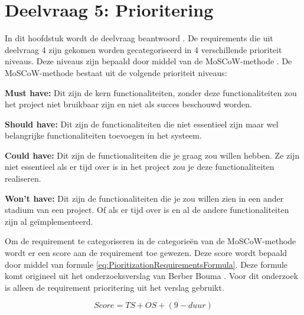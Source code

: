 \section{Deelvraag 5: Prioritering}
\label{sec:Prioritering}
In dit hoofdstuk wordt de deelvraag beantwoord \qw{\textit{\SubquestionFive}}.
De requirements die uit deelvraag 4 zijn gekomen worden gecategoriseerd in 4 verschillende prioriteit niveaus.
Deze niveaus zijn bepaald door middel van de MoSCoW-methode \Parencite{MoSCoW}.
De MoSCoW-methode bestaat uit de volgende prioriteit niveaus:

\whitespace
\textbf{Must have:} Dit zijn de kern functionaliteiten, zonder deze functionaliteiten zou het project niet bruikbaar zijn en niet als succes beschouwd worden.

\whitespace[1]
\textbf{Should have:} Dit zijn de functionaliteiten die niet essentieel zijn maar wel belangrijke functionaliteiten toevoegen in het systeem.

\whitespace[1]
\textbf{Could have:} Dit zijn de functionaliteiten die je graag zou willen hebben.
Ze zijn niet essentieel als er tijd over is in het project zou je deze functionaliteiten realiseren.

\whitespace[1]
\textbf{Won't have:} Dit zijn de functionaliteiten die je zou willen zien in een ander stadium van een project.
Of als er tijd over is en al de andere functionaliteiten zijn al geïmplementeerd.

\whitespace[2]
Om de requirement te categoriseren in de categorieën van de MoSCoW-methode wordt er een score aan de requirement toe gewezen.
Deze score wordt bepaald door middel van formule \ref{eq:PioritizationRequirementsFormula}.
Deze formule komt origineel uit het onderzoeksverslag van Berber Bouma \Parencite{BerberVerslag}.
Voor dit onderzoek is alleen de requirement prioritering uit het verslag gebruikt.

\whitespace
\begin{equation}
	\label{eq:PioritizationRequirementsFormula}
	Score = TS + OS + (9 - duur)
\end{equation}

